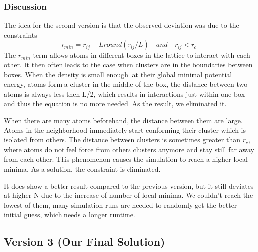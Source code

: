 \documentclass{scrartcl}
\begin{document}
\subsubsection{Discussion}
\par The idea for the second version is that the observed deviation was due to the constraints
\begin{equation} \label{eq:8}
    r_{min} = r_{ij} - Lround(r_{ij}/L) \quad and \quad r_{ij} <r_{c}
\end{equation} 
The $r_{min}$ term allows atoms in different boxes in the lattice to interact with each other. It then often leads to the case when clusters are in the boundaries between boxes. When the density is small enough, at their global minimal potential energy, atoms form a cluster in the middle of the box, the distance between two atoms is always less then L/2, which results in interactions just within one box and thus the equation is no more needed. As the result, we eliminated it.
\par When there are many atoms beforehand, the distance between them are large. Atoms in the neighborhood immediately start conforming their cluster which is isolated from others. The distance between clusters is sometimes greater than ${r_{c}}$, where atoms do not feel force from others clusters anymore and stay still far away from each other. This phenomenon causes the simulation to reach a higher local minima. As a solution, the constraint is eliminated.
\par It does show a better result compared to the previous version, but it still deviates at higher N due to the increase of number of local minima. We couldn't reach the lowest of them, many simulation runs are needed to randomly get the better initial guess, which needs a longer runtime.
\newpage
\subsection{Version 3 (Our Final Solution)}
\end{document}
